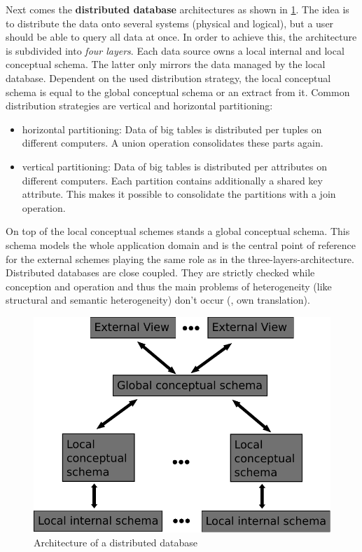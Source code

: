 Next comes the \textbf{distributed database} architectures as shown in \ref{DistributedDatabaseArchitecture}. The idea is to distribute the data onto several systems (physical and logical), but a user should be able to query all data at once. In order to achieve this, the architecture is subdivided into \textit{four layers}. Each data source owns a local internal and local conceptual schema. The latter only mirrors the data managed by the local database. Dependent on the used distribution strategy, the local conceptual schema is equal to the global conceptual schema  or an extract from it. Common distribution strategies are vertical and horizontal partitioning: 
\begin{itemize}
\item horizontal partitioning: Data of big tables is distributed per tuples on different computers. A union operation consolidates these parts again.
\item vertical partitioning: Data of big tables is distributed per attributes on different computers. Each partition contains additionally a shared key attribute. This makes it possible to consolidate the partitions with a join operation.
\end{itemize}
On top of the local conceptual schemes stands a global conceptual schema. This schema models the whole application domain and is the central point of reference for the external schemes playing the same role as in the three-layers-architecture.
Distributed databases are close coupled. They are strictly checked while conception and operation and thus the main problems of heterogeneity (like structural and semantic heterogeneity) don't occur (\cite[p. 91-93]{DBLP:books/dp/LeserN2006}, own translation).
\begin{figure}[H]
	\begin{center}
		\includegraphics[scale=0.5]{figures/distributedDatabaseArchitecture.pdf}
	\end{center}
	\caption{Architecture of a distributed database}
	\label{DistributedDatabaseArchitecture}
\end{figure}
